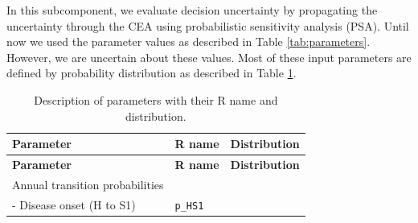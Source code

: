 \documentclass[]{book}
\begin{document}
In this subcomponent, we evaluate decision uncertainty by propagating the uncertainty through the CEA using probabilistic sensitivity analysis (PSA). Until now we used the parameter values as described in Table \ref{tab:parameters}. However, we are uncertain about these values. Most of these input parameters are defined by probability distribution as described in Table \ref{tab:parameters-PSA}.

\begin{longtable}[]{@{}lll@{}}
\caption{\label{tab:parameters-PSA} Description of parameters with their R name and distribution.}\tabularnewline
\toprule
\begin{minipage}[b]{0.33\columnwidth}\raggedright
\textbf{Parameter}\strut
\end{minipage} & \begin{minipage}[b]{0.13\columnwidth}\raggedright
\textbf{R name}\strut
\end{minipage} & \begin{minipage}[b]{0.46\columnwidth}\raggedright
\textbf{Distribution}\strut
\end{minipage}\tabularnewline
\midrule
\endfirsthead
\toprule
\begin{minipage}[b]{0.33\columnwidth}\raggedright
\textbf{Parameter}\strut
\end{minipage} & \begin{minipage}[b]{0.13\columnwidth}\raggedright
\textbf{R name}\strut
\end{minipage} & \begin{minipage}[b]{0.46\columnwidth}\raggedright
\textbf{Distribution}\strut
\end{minipage}\tabularnewline
\midrule
\endhead
\begin{minipage}[t]{0.33\columnwidth}\raggedright
Annual transition probabilities\strut
\end{minipage} & \begin{minipage}[t]{0.13\columnwidth}\raggedright
\strut
\end{minipage} & \begin{minipage}[t]{0.46\columnwidth}\raggedright
\strut
\end{minipage}\tabularnewline
\begin{minipage}[t]{0.33\columnwidth}\raggedright
- Disease onset (H to S1)\strut
\end{minipage} & \begin{minipage}[t]{0.13\columnwidth}\raggedright
\texttt{p\_HS1}\strut
\end{minipage} & \begin{minipage}[t]{0.46\columnwidth}\raggedright

\end{minipage}
\end{longtable}
\end{document}

